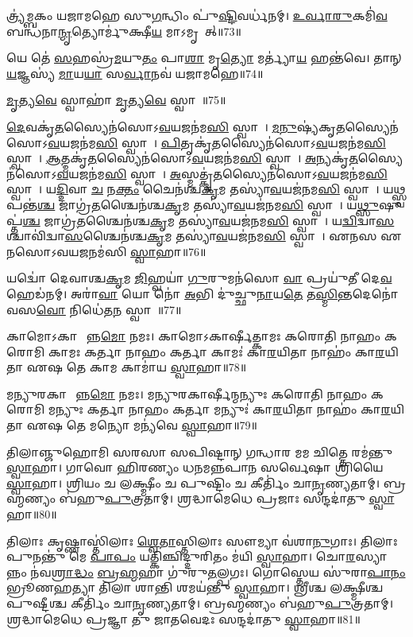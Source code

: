 𑌤𑍍𑌰𑍍𑌯॑𑌮𑍍𑌬𑌕𑌂 𑌯𑌜𑌾𑌮𑌹𑍇 𑌸𑍁\ul{𑌗}𑌨𑍍𑌧𑌿𑌂 𑌪𑍁॑\ul{𑌷𑍍𑌟𑌿}𑌵𑌰𑍍𑌧॑𑌨𑌮𑍍। 
\ul{𑌉}\ul{𑌰𑍍𑌵𑌾}\ul{𑌰𑍁}𑌕𑌮𑌿॑\ul{𑌵} 𑌬𑌨𑍍𑌧॑𑌨𑌾\ul{𑌨𑍍𑌮𑍃}𑌤𑍍𑌯𑍋𑌰𑍍𑌮𑍁॑𑌕𑍍𑌷𑍀\ul{𑌯} 𑌮𑌾𑌽𑌮𑍃𑌤𑌾᳚𑌤𑍍॥73॥
\anuvakamend 

𑌯𑍇 𑌤𑍇॑ \ul{𑌸}𑌹𑌸𑍍𑌰॑\ul{𑌮}𑌯𑍁\ul{𑌤𑌂} 𑌪𑌾\ul{𑌶𑌾} 𑌮𑍃\ul{𑌤𑍍𑌯𑍋} 𑌮𑌰𑍍𑌤𑍍𑌯𑌾॑\ul{𑌯} 𑌹𑌨𑍍𑌤॑𑌵𑍇। 
𑌤𑌾𑌨𑍍 \ul{𑌯}𑌜𑍍𑌞𑌸𑍍𑌯॑ \ul{𑌮𑌾}𑌯\ul{𑌯𑌾} 𑌸\ul{𑌰𑍍𑌵𑌾}𑌨𑌵॑ 𑌯𑌜𑌾𑌮𑌹𑍇॥74॥\anuvakamend
 
\ul{𑌮𑍃}𑌤𑍍𑌯\ul{𑌵𑍇} 𑌸𑍍𑌵𑌾𑌹𑌾॑ \ul{𑌮𑍃}𑌤𑍍𑌯\ul{𑌵𑍇} 𑌸𑍍𑌵𑌾𑌹𑌾᳚॥75॥%
\anuvakamend 

\ul{𑌦𑍇}𑌵𑌕𑍃॑\ul{𑌤}𑌸𑍍𑌯𑍈𑌨॑𑌸𑍋𑌽\ul{𑌵}𑌯𑌜𑌨॑𑌮\ul{𑌸𑌿} 𑌸𑍍𑌵𑌾𑌹𑌾᳚। 
\ul{𑌮}\ul{𑌨𑍁}𑌷𑍍𑌯॑𑌕𑍃\ul{𑌤}𑌸𑍍𑌯𑍈𑌨॑𑌸𑍋\-𑌽\ul{𑌵}𑌯𑌜𑌨॑𑌮\ul{𑌸𑌿} 𑌸𑍍𑌵𑌾𑌹𑌾᳚। 
\ul{𑌪𑌿}𑌤𑍃𑌕𑍃॑\ul{𑌤}𑌸𑍍𑌯𑍈𑌨॑𑌸𑍋\-𑌽\ul{𑌵}𑌯𑌜𑌨॑𑌮\ul{𑌸𑌿} 𑌸𑍍𑌵𑌾𑌹𑌾᳚। 
\ul{𑌆}𑌤𑍍𑌮𑌕𑍃॑\ul{𑌤}𑌸𑍍𑌯𑍈𑌨॑𑌸𑍋\-𑌽\ul{𑌵}𑌯𑌜𑌨॑𑌮\ul{𑌸𑌿} 𑌸𑍍𑌵𑌾𑌹𑌾᳚। 
\ul{𑌅}𑌨𑍍𑌯𑌕𑍃॑\ul{𑌤}𑌸𑍍𑌯𑍈𑌨॑𑌸𑍋\-𑌽\ul{𑌵}𑌯𑌜𑌨॑𑌮\ul{𑌸𑌿} 𑌸𑍍𑌵𑌾𑌹𑌾᳚। 
\ul{𑌅}𑌸𑍍𑌮𑌤𑍍𑌕𑍃॑\ul{𑌤}𑌸𑍍𑌯𑍈𑌨॑𑌸𑍋\-𑌽\ul{𑌵}𑌯𑌜𑌨॑𑌮\ul{𑌸𑌿} 𑌸𑍍𑌵𑌾𑌹𑌾᳚। 
𑌯\ul{𑌦𑍍𑌦𑌿}𑌵𑌾 \ul{𑌚} 𑌨\ul{𑌕𑍍𑌤𑌂} 𑌚𑍈𑌨॑𑌶𑍍𑌚\ul{𑌕𑍃}𑌮 𑌤𑌸𑍍𑌯𑌾॑\ul{𑌵}𑌯𑌜॑𑌨𑌮\ul{𑌸𑌿} 𑌸𑍍𑌵𑌾𑌹𑌾᳚। 
𑌯\ul{𑌥𑍍𑌸𑍍𑌵}𑌪𑌨𑍍𑌤॑\ul{𑌶𑍍𑌚} 𑌜𑌾𑌗𑍍𑌰॑\ul{𑌤}𑌶𑍍𑌚𑍈𑌨॑𑌶𑍍𑌚\ul{𑌕𑍃}𑌮 𑌤𑌸𑍍𑌯𑌾॑\ul{𑌵}𑌯𑌜॑𑌨𑌮\ul{𑌸𑌿} 𑌸𑍍𑌵𑌾𑌹𑌾᳚। 
𑌯\ul{𑌥𑍍𑌸𑍁}𑌷𑍁𑌪𑍍𑌤॑\ul{𑌶𑍍𑌚} 𑌜𑌾𑌗𑍍𑌰॑\ul{𑌤}𑌶𑍍𑌚𑍈𑌨॑𑌶𑍍𑌚\ul{𑌕𑍃}𑌮 𑌤𑌸𑍍𑌯𑌾॑\ul{𑌵}𑌯𑌜॑𑌨𑌮\ul{𑌸𑌿} 𑌸𑍍𑌵𑌾𑌹𑌾᳚। 
𑌯\ul{𑌦𑍍𑌵𑌿}𑌦𑍍𑌵𑌾\ul{𑌸}𑌶𑍍𑌚𑌾𑌵𑌿॑𑌦𑍍𑌵𑌾\ul{𑌸}𑌶𑍍𑌚𑍈𑌨॑𑌶𑍍𑌚\ul{𑌕𑍃}𑌮 𑌤𑌸𑍍𑌯𑌾॑\ul{𑌵}𑌯𑌜॑𑌨𑌮\ul{𑌸𑌿} 𑌸𑍍𑌵𑌾𑌹𑌾᳚। 
𑌏𑌨𑌸 𑌏𑌨𑌸𑍋𑌽𑌵𑌯𑌜𑌨𑌮॑𑌸𑌿 \ul{𑌸𑍍𑌵𑌾}𑌹𑌾॥76॥\anuvakamend

𑌯𑌦𑍍𑌵𑍋॑ 𑌦𑍇𑌵𑌾𑌶𑍍𑌚\ul{𑌕𑍃}𑌮 \ul{𑌜𑌿}𑌹𑍍𑌵𑌯𑌾॑ \ul{𑌗𑍁}𑌰𑍁𑌮𑌨॑𑌸𑍋 \ul{𑌵𑌾} 𑌪𑍍𑌰𑌯𑍁॑𑌤𑍀 𑌦𑍇\ul{𑌵} 𑌹𑍇𑌡॑𑌨𑌮𑍍। 
𑌅𑌰𑌾॑\ul{𑌵𑌾} 𑌯𑍋 𑌨𑍋॑ \ul{𑌅}𑌭𑌿 𑌦𑍁॑𑌚𑍍𑌛𑍁\ul{𑌨𑌾}𑌯\ul{𑌤𑍇} 𑌤\ul{𑌸𑍍𑌮𑌿}𑌨𑍍𑌤𑌦𑍇𑌨𑍋॑ 𑌵𑌸\ul{𑌵𑍋} 𑌨𑌿𑌧𑍇॑𑌤\ul{𑌨} 𑌸𑍍𑌵𑌾𑌹𑌾᳚॥77॥ 
\anuvakamend



𑌕𑌾𑌮𑍋𑌽𑌕𑌾𑌰𑍍\mbox{}𑌷𑍀᳚𑌨𑍍𑌨\ul{𑌮𑍋} 𑌨𑌮𑌃। 
 𑌕𑌾𑌮𑍋𑌽𑌕𑌾𑌰𑍍\mbox{}𑌷𑍀𑌤𑍍𑌕𑌾𑌮𑌃 𑌕𑌰𑍋𑌤𑌿 𑌨𑌾𑌹𑌂 𑌕𑌰𑍋𑌮𑌿 𑌕𑌾𑌮𑌃 𑌕𑌰𑍍𑌤𑌾 𑌨𑌾𑌹𑌂 𑌕𑌰𑍍𑌤𑌾 𑌕𑌾𑌮𑌃॑ 𑌕𑌾\ul{𑌰}𑌯𑌿𑌤𑌾 𑌨𑌾𑌹𑌂॑ 𑌕𑌾\ul{𑌰}𑌯𑌿𑌤𑌾 𑌏𑌷 𑌤𑍇 𑌕𑌾𑌮 𑌕𑌾𑌮𑌾॑𑌯 \ul{𑌸𑍍𑌵𑌾}𑌹𑌾॥78॥
\anuvakamend

𑌮𑌨𑍍𑌯𑍁𑌰𑌕𑌾𑌰𑍍\mbox{}𑌷𑍀᳚𑌨𑍍𑌨\ul{𑌮𑍋} 𑌨𑌮𑌃। 
𑌮𑌨𑍍𑌯𑍁𑌰𑌕𑌾𑌰𑍍\mbox{}𑌷𑍀𑌨𑍍𑌮𑌨𑍍𑌯𑍁𑌃 𑌕𑌰𑍋𑌤𑌿 𑌨𑌾𑌹𑌂 𑌕𑌰𑍋𑌮𑌿 𑌮𑌨𑍍𑌯𑍁𑌃 𑌕𑌰𑍍𑌤𑌾 𑌨𑌾𑌹𑌂 𑌕𑌰𑍍𑌤𑌾 𑌮𑌨𑍍𑌯𑍁𑌃॑ 𑌕𑌾\ul{𑌰}𑌯𑌿𑌤𑌾 𑌨𑌾𑌹𑌂॑ 𑌕𑌾\ul{𑌰}𑌯𑌿𑌤𑌾 𑌏𑌷 𑌤𑍇 𑌮𑌨𑍍𑌯𑍋 𑌮𑌨𑍍𑌯॑𑌵𑍇 \ul{𑌸𑍍𑌵𑌾}𑌹𑌾॥79॥
\anuvakamend

𑌤𑌿𑌲𑌾𑌞𑍍𑌜𑍁𑌹𑍋𑌮𑌿 𑌸𑌰𑌸𑌾 𑌸𑌪𑌿𑌷𑍍𑌟𑌾𑌨𑍍 𑌗𑌨𑍍𑌧𑌾𑌰 𑌮𑌮 𑌚𑌿𑌤𑍍𑌤𑍇 𑌰𑌮॑𑌨𑍍𑌤𑍁 \ul{𑌸𑍍𑌵𑌾}𑌹𑌾। 
𑌗𑌾𑌵𑍋 𑌹𑌿𑌰𑌣𑍍𑌯𑌂 𑌧𑌨𑌮𑌨𑍍𑌨𑌪𑌾𑌨 𑌸𑌰𑍍𑌵𑍇𑌷𑌾 𑌶𑍍𑌰𑌿॑𑌯𑍈 \ul{𑌸𑍍𑌵𑌾}𑌹𑌾। 
𑌶𑍍𑌰𑌿𑌯𑌂 𑌚 𑌲𑌕𑍍𑌷𑍍𑌮𑍀𑌂 𑌚 𑌪𑍁𑌷𑍍𑌟𑌿𑌂 𑌚 𑌕𑍀𑌰𑍍𑌤𑌿𑌂॑ 𑌚𑌾\ul{𑌨𑍃}𑌣𑍍𑌯𑌤𑌾𑌮𑍍। 
𑌬𑍍𑌰𑌹𑍍𑌮𑌣𑍍𑌯𑌂 𑌬॑𑌹𑍁\ul{𑌪𑍁}𑌤𑍍𑌰𑌤𑌾𑌮𑍍। 
𑌶𑍍𑌰𑌦𑍍𑌧𑌾𑌮𑍇𑌧𑍇 𑌪𑍍𑌰𑌜𑌾𑌃 𑌸𑌨𑍍𑌦𑌦𑌾॑𑌤𑍁 \ul{𑌸𑍍𑌵𑌾}𑌹𑌾॥80॥
\anuvakamend

𑌤𑌿𑌲𑌾𑌃 𑌕𑍃𑌷𑍍𑌣𑌾𑌸𑍍𑌤𑌿॑𑌲𑌾𑌃 \ul{𑌶𑍍𑌵𑍇}\ul{𑌤𑌾}𑌸𑍍𑌤𑌿𑌲𑌾𑌃 𑌸𑍗𑌮𑍍𑌯𑌾 𑌵॑𑌶𑌾\ul{𑌨𑍁}𑌗𑌾𑌃। 
𑌤𑌿𑌲𑌾𑌃 𑌪𑍁𑌨𑌨𑍍𑌤𑍁॑ 𑌮𑍇 \ul{𑌪𑌾}\ul{𑌪𑌂} 𑌯𑌤𑍍𑌕𑌿𑌞𑍍𑌚𑌿𑌦𑍍𑌦𑍁𑌰𑌿𑌤𑌂 𑌮॑𑌯𑌿 \ul{𑌸𑍍𑌵𑌾}𑌹𑌾। 
𑌚𑍋\ul{𑌰}𑌸𑍍𑌯𑌾𑌨𑍍𑌨𑌂 𑌨॑𑌵\ul{𑌶𑍍𑌰𑌾}\ul{𑌦𑍍𑌧𑌂} \ul{𑌬𑍍𑌰}\ul{𑌹𑍍𑌮}𑌹𑌾 𑌗𑍁॑𑌰𑍁\ul{𑌤}𑌲𑍍𑌪𑌗𑌃। 
𑌗𑍋𑌸𑍍𑌤𑍇𑌯 𑌸𑍁॑𑌰𑌾\ul{𑌪𑌾}\ul{𑌨𑌂} 𑌭𑍍𑌰𑍂𑌣𑌹𑌤𑍍𑌯𑌾 𑌤𑌿𑌲𑌾 𑌶𑌾𑌨𑍍𑌤𑌿 𑌶𑌮𑌯॑𑌨𑍍𑌤𑍁 \ul{𑌸𑍍𑌵𑌾}𑌹𑌾। 
𑌶𑍍𑌰𑍀𑌶𑍍𑌚 𑌲𑌕𑍍𑌷𑍍𑌮𑍀𑌶𑍍𑌚 𑌪𑍁𑌷𑍍𑌟𑍀𑌶𑍍𑌚 𑌕𑍀𑌰𑍍𑌤𑌿𑌂॑ 𑌚𑌾\ul{𑌨𑍃}𑌣𑍍𑌯𑌤𑌾𑌮𑍍। 
𑌬𑍍𑌰𑌹𑍍𑌮𑌣𑍍𑌯𑌂 𑌬॑𑌹𑍁\ul{𑌪𑍁}𑌤𑍍𑌰𑌤𑌾𑌮𑍍। 
𑌶𑍍𑌰𑌦𑍍𑌧𑌾𑌮𑍇𑌧𑍇 𑌪𑍍𑌰𑌜𑍍𑌞𑌾 𑌤𑍁 𑌜𑌾𑌤𑌵𑍇𑌦𑌃 𑌸𑌨𑍍𑌦𑌦𑌾॑𑌤𑍁 \ul{𑌸𑍍𑌵𑌾}𑌹𑌾॥81॥
 \anuvakamend

